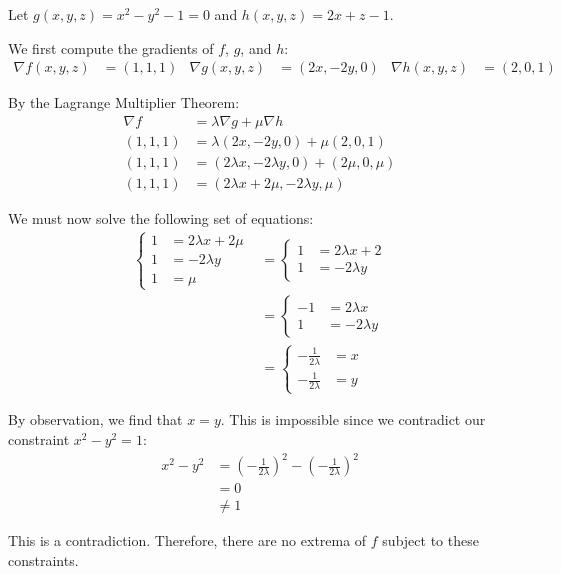 \begin{solution}
    Let \(g(x, y, z) = x^2 - y^2 - 1 = 0\) and \(h(x, y, z) = 2x + z - 1\). 
    
    We first compute the gradients of \(f\), \(g\), and \(h\):
    \begin{align}
        \nabla f(x, y, z) &= (1, 1, 1) & \nabla g(x, y, z) &= (2x, -2y, 0) & \nabla h(x, y, z) &= (2, 0, 1) 
    \end{align}
    
    By the Lagrange Multiplier Theorem:
    \begin{align}
        \nabla f &= \lambda \nabla g + \mu \nabla h \\
        (1, 1, 1) &= \lambda (2x, -2y, 0) + \mu (2, 0, 1) \\
        (1, 1, 1) &= (2\lambda x, -2\lambda y, 0) + (2\mu, 0, \mu) \\
        (1, 1, 1) &= (2\lambda x + 2\mu, -2\lambda y, \mu)
    \end{align}
    
    We must now solve the following set of equations:
    \begin{align}
        \begin{cases}
            1 &= 2\lambda x + 2\mu \\
            1 &= -2\lambda y \\
            1 &= \mu
        \end{cases}
        &=
        \begin{cases}
            1 &= 2\lambda x + 2 \\
            1 &= -2\lambda y
        \end{cases} \\
        &=
        \begin{cases}
            -1 &= 2\lambda x \\
            1 &= -2\lambda y
        \end{cases} \\
        &=
        \begin{cases}
            -\frac{1}{2\lambda} &= x \\
            -\frac{1}{2\lambda} &= y
        \end{cases}
    \end{align}
    
    By observation, we find that \(x = y\). This is impossible since we contradict our constraint \(x^2 - y^2 = 1\):
    \begin{align*}
        x^2 - y^2 &= \left(-\frac{1}{2\lambda}\right)^2 - \left(-\frac{1}{2\lambda}\right)^2 \\
        &= 0 \\
        &\neq 1
    \end{align*}
    
    This is a contradiction. Therefore, there are no extrema of \(f\) subject to these constraints.
\end{solution}

